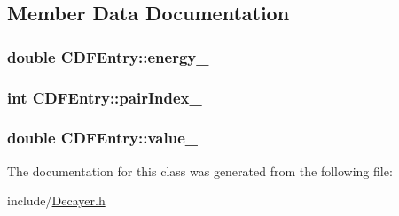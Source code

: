 \subsection{Member Data Documentation}
\hypertarget{classCDFEntry_a38595cb908b213effa5551bc11cf33ba}{
\subsubsection[{energy\-\_\-}]{\setlength{\rightskip}{0pt plus 5cm}double C\-D\-F\-Entry\-::energy\-\_\-}}\label{classCDFEntry_a38595cb908b213effa5551bc11cf33ba}
\hypertarget{classCDFEntry_abc2b0634d678993cbaf8b1451b38fc29}{
\subsubsection[{pair\-Index\-\_\-}]{\setlength{\rightskip}{0pt plus 5cm}int C\-D\-F\-Entry\-::pair\-Index\-\_\-}}\label{classCDFEntry_abc2b0634d678993cbaf8b1451b38fc29}
\hypertarget{classCDFEntry_a4f5ef593ff6dad671b8eb92ec4c3c7f7}{
\subsubsection[{value\-\_\-}]{\setlength{\rightskip}{0pt plus 5cm}double C\-D\-F\-Entry\-::value\-\_\-}}\label{classCDFEntry_a4f5ef593ff6dad671b8eb92ec4c3c7f7}


The documentation for this class was generated from the following file\-:\begin{DoxyCompactItemize}
\item 
include/\hyperlink{Decayer_8h}{Decayer.\-h}\end{DoxyCompactItemize}
